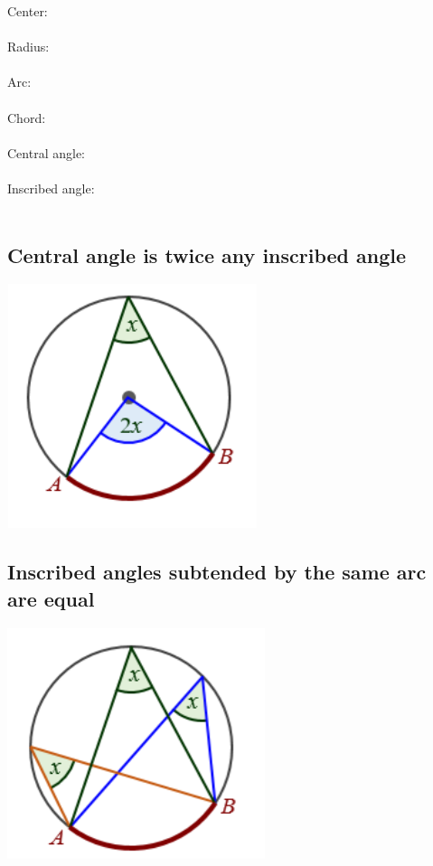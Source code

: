 \documentclass{article}
\begin{document}
Center: \\ \\
Radius: \\ \\
Arc: \\ \\
Chord: \\ \\
Central angle: \\ \\
Inscribed angle: \\ \\


\subsection{Central angle is twice any inscribed angle}
\includegraphics[scale=1.05]{Picture2.png}

\pagebreak

\subsection{Inscribed angles subtended by the same arc are equal}

\includegraphics{Picture3.png}
\end{document}
